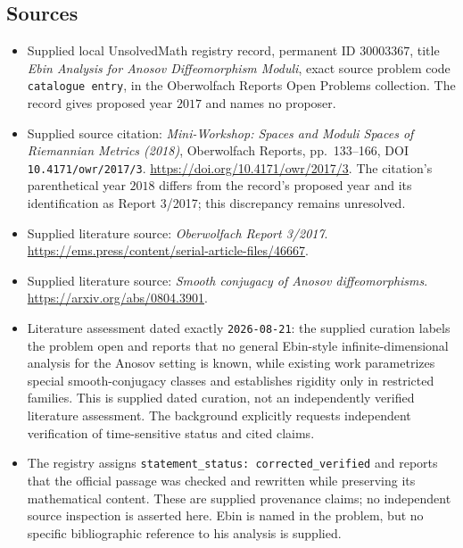 \documentclass[11pt]{article}
\begin{document}
\subsection{Sources}
\begin{itemize}
\item Supplied local UnsolvedMath registry record, permanent ID \(30003367\), title \emph{Ebin Analysis for Anosov Diffeomorphism Moduli}, exact source problem code \texttt{catalogue entry}, in the Oberwolfach Reports Open Problems collection. The record gives proposed year \(2017\) and names no proposer.
\item Supplied source citation: \emph{Mini-Workshop: Spaces and Moduli Spaces of Riemannian Metrics (2018)}, Oberwolfach Reports, pp.\ 133--166, DOI \texttt{10.4171/owr/2017/3}. \url{https://doi.org/10.4171/owr/2017/3}. The citation's parenthetical year \(2018\) differs from the record's proposed year and its identification as Report 3/2017; this discrepancy remains unresolved.
\item Supplied literature source: \emph{Oberwolfach Report 3/2017}. \url{https://ems.press/content/serial-article-files/46667}.
\item Supplied literature source: \emph{Smooth conjugacy of Anosov diffeomorphisms}. \url{https://arxiv.org/abs/0804.3901}.
\item Literature assessment dated exactly \texttt{2026-08-21}: the supplied curation labels the problem open and reports that no general Ebin-style infinite-dimensional analysis for the Anosov setting is known, while existing work parametrizes special smooth-conjugacy classes and establishes rigidity only in restricted families. This is supplied dated curation, not an independently verified literature assessment. The background explicitly requests independent verification of time-sensitive status and cited claims.
\item The registry assigns \texttt{statement\_status: corrected\_verified} and reports that the official passage was checked and rewritten while preserving its mathematical content. These are supplied provenance claims; no independent source inspection is asserted here. Ebin is named in the problem, but no specific bibliographic reference to his analysis is supplied.
\end{itemize}
\end{document}
